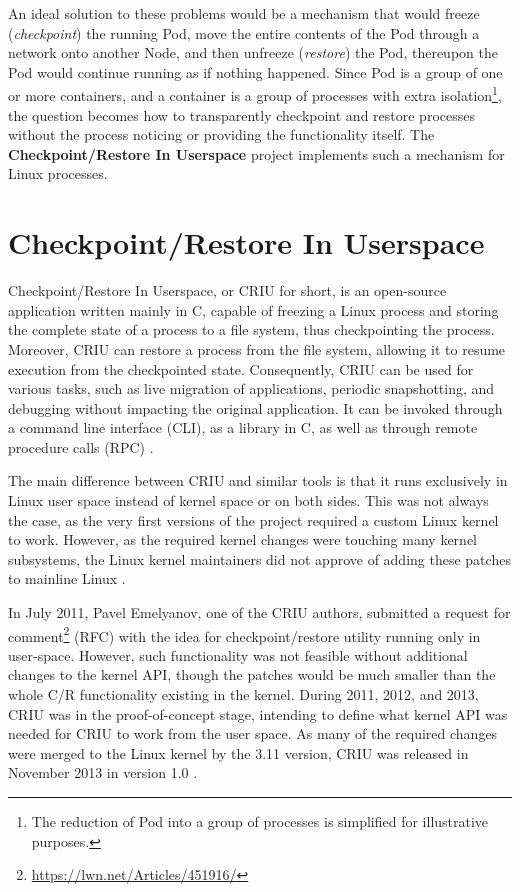 \documentclass[
  digital,     %
  oneside,     %
  nosansbold,  %
  nocolorbold, %
  lof,         %
  lot,         %
]{fithesis4}
\begin{document}
An ideal solution to these problems would be a mechanism that would freeze (\emph{checkpoint}) the running Pod, move the entire contents of the Pod through a network onto another Node, and then unfreeze (\emph{restore}) the Pod, thereupon the Pod would continue running as if nothing happened. Since Pod is a group of one or more containers, and a container is a group of processes with extra isolation\footnote{The reduction of Pod into a group of processes is simplified for illustrative purposes.}, the question becomes how to transparently checkpoint and restore processes without the process noticing or providing the functionality itself. The \textbf{Checkpoint/Restore In Userspace} project implements such a mechanism for Linux processes.


\section{Checkpoint/Restore In Userspace}
Checkpoint/Restore In Userspace, or CRIU for short, is an open-source application written mainly in C, capable of freezing a Linux process and storing the complete state of a process to a file system, thus checkpointing the process. Moreover, CRIU can restore a process from the file system, allowing it to resume execution from the checkpointed state. Consequently, CRIU can be used for various tasks, such as live migration of applications, periodic snapshotting, and debugging without impacting the original application. It can be invoked through a command line interface (CLI), as a library in C, as well as through remote procedure calls (RPC) \cite{criu_main}.

The main difference between CRIU and similar tools is that it runs exclusively in Linux user space instead of kernel space or on both sides. This was not always the case, as the very first versions of the project required a custom Linux kernel to work. However, as the required kernel changes were touching many kernel subsystems, the Linux kernel maintainers did not approve of adding these patches to mainline Linux \cite{criu_podcast}.

In July 2011, Pavel Emelyanov, one of the CRIU authors, submitted a request for comment\footnote{\url{https://lwn.net/Articles/451916/}} (RFC) with the idea for checkpoint/restore utility running only in user-space. However, such functionality was not feasible without additional changes to the kernel API, though the patches would be much smaller than the whole C/R functionality existing in the kernel. During 2011, 2012, and 2013, CRIU was in the proof-of-concept stage, intending to define what kernel API was needed for CRIU to work from the user space. As many of the required changes were merged to the Linux kernel by the 3.11 version, CRIU was released in November 2013 in version 1.0 \cite{criu_history}. 
\end{document}

